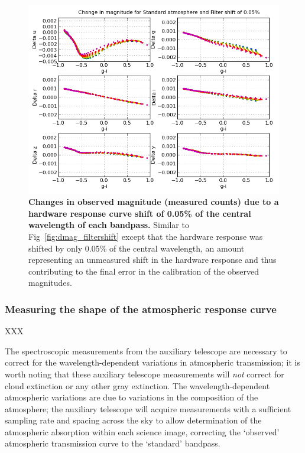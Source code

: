 \documentclass[12pt,preprint]{aastex}
\begin{document}
\begin{figure}
\centering
\includegraphics[width=6in]{delta_mags_filtershift_small}
\caption{{\small 
{\bf Changes in observed magnitude (measured counts) due 
to a hardware response curve shift of 0.05\% of the central wavelength
of each bandpass.} Similar to Fig~\ref{fig:dmag_filtershift} except
that the hardware response was shifted by only 0.05\% of the central
wavelength, an amount representing an unmeasured shift in the hardware
response and thus contributing to the final error in the calibration
of the observed magnitudes. }}
\label{fig:dmag_filtershift_small} 
\end{figure}
 

\subsubsection{Measuring the shape of the atmospheric response curve}
\label{sec:phi_atmo}

XXX

The spectroscopic measurements from the auxiliary telescope are
necessary to correct for the wavelength-dependent variations in
atmospheric transmission; it is worth noting that these auxiliary
telescope measurements will {\it not} correct for cloud extinction or
any other gray extinction. The wavelength-dependent atmospheric
variations are due to variations in the composition of the atmosphere;
the auxiliary telescope will acquire measurements with a sufficient
sampling rate and spacing across the sky to allow determination of the
atmospheric absorption within each science image, correcting the
`observed' atmospheric transmission curve to the `standard' bandpass.
\end{document}

